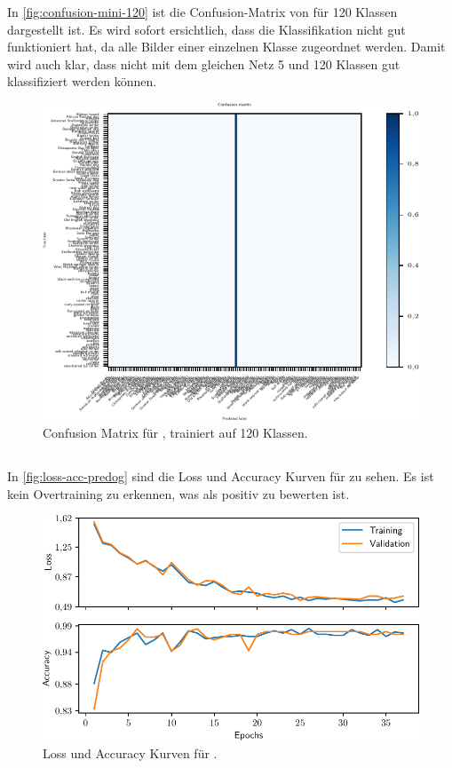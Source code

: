 In \autoref{fig:confusion-mini-120} ist die Confusion-Matrix von \MiniDog für
120 Klassen dargestellt ist. Es wird sofort ersichtlich, dass die Klassifikation
nicht gut funktioniert hat, da alle Bilder einer einzelnen Klasse zugeordnet
werden. Damit wird auch klar, dass nicht mit dem gleichen Netz 5 und 120 Klassen
gut klassifiziert werden können.

\begin{figure}
  \centering
  \includegraphics{pics/ergebnisse/MiniDogNN/confusion_matrix_mini120.pdf}
  \caption{Confusion Matrix für \MiniDog, trainiert auf 120 Klassen.}
  \label{fig:confusion-mini-120}
\end{figure}

\subsection{\PreDog}

In \autoref{fig:loss-acc-predog} sind die Loss und Accuracy Kurven für \PreDog zu sehen.
Es ist kein Overtraining zu erkennen, was als positiv zu bewerten ist.

\begin{figure}
  \centering
  \includegraphics[scale=0.8]{pics/ergebnisse/PreDogNN/history_epoch.pdf}
  \caption{Loss und Accuracy Kurven für \PreDog.}
  \label{fig:loss-acc-predog}
\end{figure}

